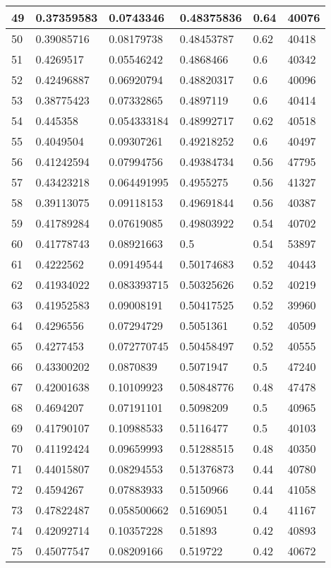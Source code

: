 \begin{longtable}{|l|l|l|l|l|l|}
49 & 0.37359583 & 0.0743346 & 0.48375836 & 0.64 & 40076 \\ \hline 
50 & 0.39085716 & 0.08179738 & 0.48453787 & 0.62 & 40418 \\ \hline 
51 & 0.4269517 & 0.05546242 & 0.4868466 & 0.6 & 40342 \\ \hline 
52 & 0.42496887 & 0.06920794 & 0.48820317 & 0.6 & 40096 \\ \hline 
53 & 0.38775423 & 0.07332865 & 0.4897119 & 0.6 & 40414 \\ \hline 
54 & 0.445358 & 0.054333184 & 0.48992717 & 0.62 & 40518 \\ \hline 
55 & 0.4049504 & 0.09307261 & 0.49218252 & 0.6 & 40497 \\ \hline 
56 & 0.41242594 & 0.07994756 & 0.49384734 & 0.56 & 47795 \\ \hline 
57 & 0.43423218 & 0.064491995 & 0.4955275 & 0.56 & 41327 \\ \hline 
58 & 0.39113075 & 0.09118153 & 0.49691844 & 0.56 & 40387 \\ \hline 
59 & 0.41789284 & 0.07619085 & 0.49803922 & 0.54 & 40702 \\ \hline 
60 & 0.41778743 & 0.08921663 & 0.5 & 0.54 & 53897 \\ \hline 
61 & 0.4222562 & 0.09149544 & 0.50174683 & 0.52 & 40443 \\ \hline 
62 & 0.41934022 & 0.083393715 & 0.50325626 & 0.52 & 40219 \\ \hline 
63 & 0.41952583 & 0.09008191 & 0.50417525 & 0.52 & 39960 \\ \hline 
64 & 0.4296556 & 0.07294729 & 0.5051361 & 0.52 & 40509 \\ \hline 
65 & 0.4277453 & 0.072770745 & 0.50458497 & 0.52 & 40555 \\ \hline 
66 & 0.43300202 & 0.0870839 & 0.5071947 & 0.5 & 47240 \\ \hline 
67 & 0.42001638 & 0.10109923 & 0.50848776 & 0.48 & 47478 \\ \hline 
68 & 0.4694207 & 0.07191101 & 0.5098209 & 0.5 & 40965 \\ \hline 
69 & 0.41790107 & 0.10988533 & 0.5116477 & 0.5 & 40103 \\ \hline 
70 & 0.41192424 & 0.09659993 & 0.51288515 & 0.48 & 40350 \\ \hline 
71 & 0.44015807 & 0.08294553 & 0.51376873 & 0.44 & 40780 \\ \hline 
72 & 0.4594267 & 0.07883933 & 0.5150966 & 0.44 & 41058 \\ \hline 
73 & 0.47822487 & 0.058500662 & 0.5169051 & 0.4 & 41167 \\ \hline 
74 & 0.42092714 & 0.10357228 & 0.51893 & 0.42 & 40893 \\ \hline 
75 & 0.45077547 & 0.08209166 & 0.519722 & 0.42 & 40672 \\ \hline 
\end{longtable}